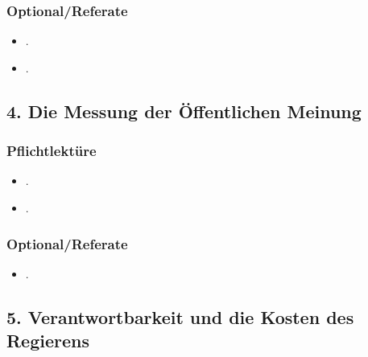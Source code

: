 \documentclass[abstract=on,parskip=full,headings=standardclasses,fontsize=11pt,paper=a4]{scrartcl}
\begin{document}
\subsubsection*{Optional/Referate}
\begin{itemize}
\item {}.
\item {}.
\end{itemize}


\subsection{4. Die Messung der Öffentlichen Meinung}

\subsubsection*{Pflichtlektüre}
\begin{itemize}
\item {}.
\item {}.
\end{itemize}


\subsubsection*{Optional/Referate}
\begin{itemize}
\item {}.
\end{itemize}


%




\subsection{5. Verantwortbarkeit und die Kosten des Regierens}
\end{document}
